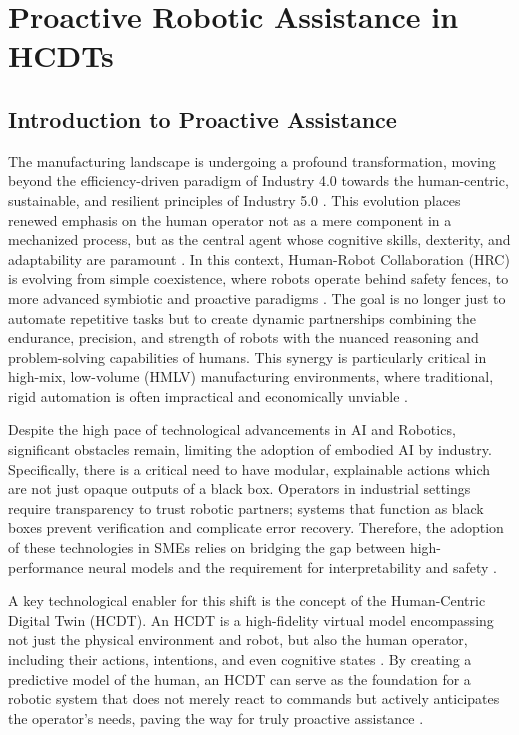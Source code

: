 \chapter{Proactive Robotic Assistance in HCDTs}
\label{chap:assistance}

\section{Introduction to Proactive Assistance}
\label{sec:proactive_intro}

The manufacturing landscape is undergoing a profound transformation, moving beyond the efficiency-driven paradigm of Industry 4.0 towards the human-centric, sustainable, and resilient principles of Industry 5.0 \citep{Andronas2021}. This evolution places renewed emphasis on the human operator not as a mere component in a mechanized process, but as the central agent whose cognitive skills, dexterity, and adaptability are paramount \citep{Polini2020}. In this context, Human-Robot Collaboration (HRC) is evolving from simple coexistence, where robots operate behind safety fences, to more advanced symbiotic and proactive paradigms \citep{Andronas2021, Asad2023}. The goal is no longer just to automate repetitive tasks but to create dynamic partnerships combining the endurance, precision, and strength of robots with the nuanced reasoning and problem-solving capabilities of humans. This synergy is particularly critical in high-mix, low-volume (HMLV) manufacturing environments, where traditional, rigid automation is often impractical and economically unviable \citep{Polini2020, David2023}.

Despite the high pace of technological advancements in AI and Robotics, significant obstacles remain, limiting the adoption of embodied AI by industry. Specifically, there is a critical need to have modular, explainable actions which are not just opaque outputs of a black box. Operators in industrial settings require transparency to trust robotic partners; systems that function as black boxes prevent verification and complicate error recovery. Therefore, the adoption of these technologies in SMEs relies on bridging the gap between high-performance neural models and the requirement for interpretability and safety \citep{Adadi2018, Gunning2019}.

A key technological enabler for this shift is the concept of the Human-Centric Digital Twin (HCDT). An HCDT is a high-fidelity virtual model encompassing not just the physical environment and robot, but also the human operator, including their actions, intentions, and even cognitive states \citep{Polini2020}. By creating a predictive model of the human, an HCDT can serve as the foundation for a robotic system that does not merely react to commands but actively anticipates the operator's needs, paving the way for truly proactive assistance \citep{Polini2020}.

